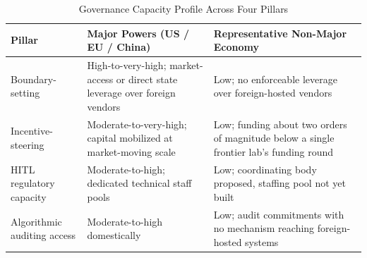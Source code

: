 \documentclass[journal]{IEEEtran}
\begin{document}
\begin{table}[!t]
\caption{Governance Capacity Profile Across Four Pillars}
\label{tab:comparison}
\centering
\footnotesize
\begin{tabular}{>{\raggedright\arraybackslash}p{1.35cm}>{\raggedright\arraybackslash}p{1.85cm}>{\raggedright\arraybackslash}p{1.85cm}}
\toprule
\rowcolor{darkblue!15}
\textbf{Pillar} & \textbf{Major Powers (US / EU / China)} & \textbf{Representative Non-Major Economy} \\
\midrule
\rowcolor{steelblue!8}
Boundary-setting & High-to-very-high; market-access or direct state leverage over foreign vendors & Low; no enforceable leverage over foreign-hosted vendors \\
\rowcolor{tealcolor!8}
Incentive-steering & Moderate-to-very-high; capital mobilized at market-moving scale & Low; funding about two orders of magnitude below a single frontier lab's funding round \\
\rowcolor{ambercolor!8}
HITL regulatory capacity & Moderate-to-high; dedicated technical staff pools & Low; coordinating body proposed, staffing pool not yet built \\
\rowcolor{slateblue!8}
Algorithmic auditing access & Moderate-to-high domestically & Low; audit commitments with no mechanism reaching foreign-hosted systems \\
\bottomrule
\end{tabular}
\end{table}
\end{document}
